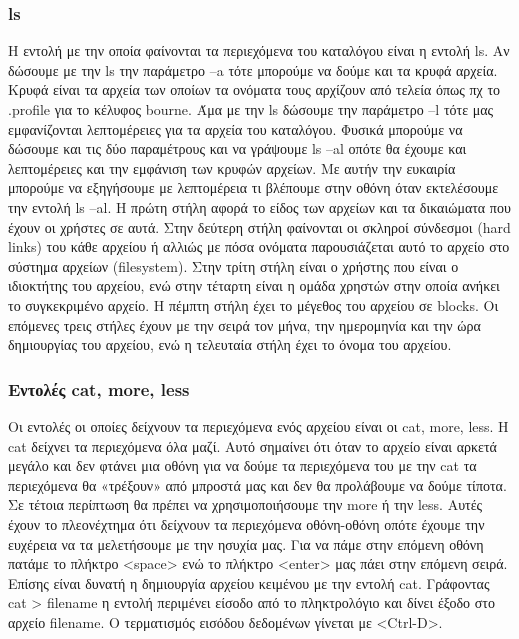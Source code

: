 \subsubsection{ls}
Η εντολή με την οποία φαίνονται τα περιεχόμενα του καταλόγου είναι η εντολή ls.
Αν δώσουμε με την ls την παράμετρο –a τότε μπορούμε να δούμε και τα κρυφά αρχεία. Κρυφά είναι τα αρχεία των οποίων τα ονόματα τους αρχίζουν από τελεία όπως πχ το .profile για το κέλυφος bourne. Άμα με την ls δώσουμε την παράμετρο –l τότε μας εμφανίζονται λεπτομέρειες για τα αρχεία του καταλόγου. Φυσικά μπορούμε να δώσουμε και τις δύο παραμέτρους και να γράψουμε ls –al οπότε θα έχουμε και λεπτομέρειες και την
εμφάνιση των κρυφών αρχείων. Με αυτήν την ευκαιρία μπορούμε να εξηγήσουμε με
λεπτομέρεια τι βλέπουμε στην οθόνη όταν εκτελέσουμε την εντολή ls –al.
Η πρώτη στήλη αφορά το είδος των αρχείων και τα δικαιώματα που έχουν οι χρήστες
σε αυτά. Στην δεύτερη στήλη φαίνονται οι σκληροί σύνδεσμοι (hard links) του κάθε
αρχείου ή αλλιώς με πόσα ονόματα παρουσιάζεται αυτό το αρχείο στο σύστημα
αρχείων (filesystem). Στην τρίτη στήλη είναι ο χρήστης που είναι ο ιδιοκτήτης του
αρχείου, ενώ στην τέταρτη είναι η ομάδα χρηστών στην οποία ανήκει το
συγκεκριμένο αρχείο. Η πέμπτη στήλη έχει το μέγεθος του αρχείου σε blocks. Οι
επόμενες τρεις στήλες έχουν με την σειρά τον μήνα, την ημερομηνία και την ώρα
δημιουργίας του αρχείου, ενώ η τελευταία στήλη έχει το όνομα του αρχείου.

\subsubsection{Εντολές cat, more, less}

Οι εντολές οι οποίες δείχνουν τα περιεχόμενα ενός αρχείου είναι οι cat, more, less. Η
cat δείχνει τα περιεχόμενα όλα μαζί. Αυτό σημαίνει ότι όταν το αρχείο είναι αρκετά
μεγάλο και δεν φτάνει μια οθόνη για να δούμε τα περιεχόμενα του με την cat τα
περιεχόμενα θα «τρέξουν» από μπροστά μας και δεν θα προλάβουμε να δούμε τίποτα.
Σε τέτοια περίπτωση θα πρέπει να χρησιμοποιήσουμε την more ή την less. Αυτές
έχουν το πλεονέχτημα ότι δείχνουν τα περιεχόμενα οθόνη-οθόνη οπότε έχουμε την
ευχέρεια να τα μελετήσουμε με την ησυχία μας. Για να πάμε στην επόμενη οθόνη
πατάμε το πλήκτρο <space> ενώ το πλήκτρο <enter> μας πάει στην επόμενη σειρά.
Επίσης είναι δυνατή η δημιουργία αρχείου κειμένου με την εντολή cat. Γράφοντας
cat > filename η εντολή περιμένει είσοδο από το πληκτρολόγιο και δίνει έξοδο στο
αρχείο filename. Ο τερματισμός εισόδου δεδομένων γίνεται με <Ctrl-D>.

